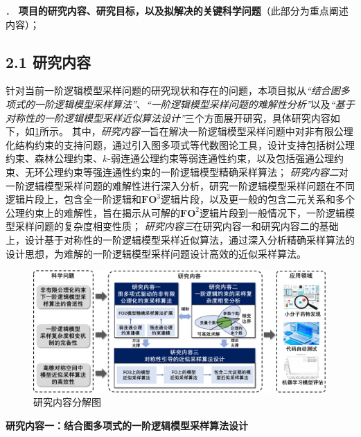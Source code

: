 \documentclass[12pt,UTF8,AutoFakeBold=3,a4paper]{ctexart} %
\newcommand{\fotwo}{\ensuremath{\mathbf{FO}^2}}
\newcommand{\fothree}{\ensuremath{\mathbf{FO}^3}}
\begin{document}
\begin{spacing}{1.1}
{\kaishu \wuhao


}
\end{spacing}
\newpage

\vspace{1.5 \baselineskip}
{\sihao \color{MsBlue} ． {\bfseries 项目的研究内容、研究目标，以及拟解决的关键科学问题}（此部分为重点阐述内容）；}

\subsection{2.1 研究内容}

针对当前一阶逻辑模型采样问题的研究现状和存在的问题，本项目拟从\emph{``结合图多项式的一阶逻辑模型采样算法''}、\emph{``一阶逻辑模型采样问题的难解性分析''}以及\emph{``基于对称性的一阶逻辑模型采样近似算法设计''}三个方面展开研究，具体研究内容如下，如\cref{fig:content}所示。
其中，\emph{研究内容一}旨在解决一阶逻辑模型采样问题中对非有限公理化结构约束的支持问题，通过引入图多项式等代数图论工具，设计支持包括树公理约束、森林公理约束、$k$-弱连通公理约束等弱连通性约束，以及包括强通公理约束、无环公理约束等强连通性约束的一阶逻辑模型精确采样算法；
\emph{研究内容二}对一阶逻辑模型采样问题的难解性进行深入分析，研究一阶逻辑模型采样问题在不同逻辑片段上，包含全一阶逻辑和\fothree{}逻辑片段，以及更一般的包含二元关系和多个公理约束上的难解性，旨在揭示从可解的\fotwo{}逻辑片段到一般情况下，一阶逻辑模型采样问题的复杂度相变性质；
\emph{研究内容三}在研究内容一和研究内容二的基础上，设计基于对称性的一阶逻辑模型采样近似算法，通过深入分析精确采样算法的设计思想，为难解的一阶逻辑模型采样问题设计高效的近似采样算法。


\begin{figure}[H]
  \centering
  \includegraphics[width=\textwidth]{figs/content.pdf}
  \caption{研究内容分解图}
  \label{fig:content}
\end{figure}

\textbf{研究内容一：结合图多项式的一阶逻辑模型采样算法设计}
\end{document}
